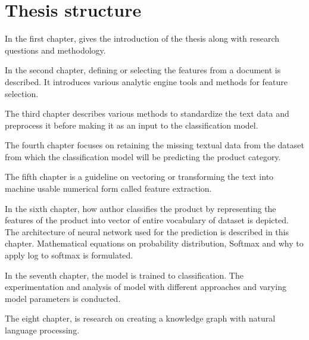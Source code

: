 \section{Thesis structure}

In the first chapter, gives the introduction of the thesis along with research questions and methodology.

In the second chapter, defining or selecting the features from a document is described. It introduces various analytic engine tools and methods for feature selection. 

The third chapter describes various methods to standardize the text data and preprocess it before making it as an input to the classification model.

The fourth chapter focuses on retaining the missing textual data from the dataset from which the classification model will be predicting the product category. 

The fifth chapter is a guideline on vectoring or transforming the text into machine usable numerical form called feature extraction.

In the sixth chapter, how author classifies the product by representing the features of the product into vector of entire vocabulary of dataset is depicted. The architecture of neural network used for the prediction is described in this chapter. Mathematical equations on probability distribution, Softmax and why to apply log to softmax is formulated. 

In the seventh chapter, the model is trained to classification. The experimentation and analysis of model with different approaches and varying model parameters is conducted.

The eight chapter, is research on creating a knowledge graph with natural language processing.